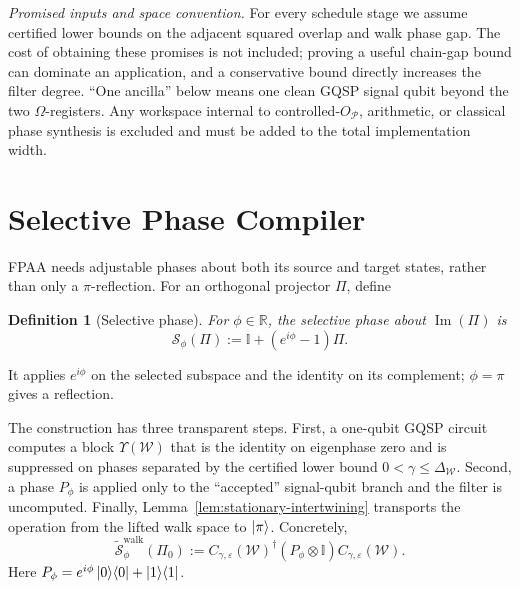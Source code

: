 \documentclass[10pt,conference]{IEEEtran}
\theoremstyle{plain}
\newtheorem{definition}[theorem]{Definition}
\theoremstyle{remark}
\begin{document}
\emph{Promised inputs and space convention.}
For every schedule stage we assume certified lower bounds on the
adjacent squared overlap and walk phase gap.  The cost of obtaining
these promises is not included; proving a useful chain-gap bound can
dominate an application, and a conservative bound directly increases
the filter degree.  ``One ancilla'' below means one clean GQSP signal
qubit beyond the two \(\Omega\)-registers.  Any workspace internal to
controlled-\(O_{\mathcal P}\), arithmetic, or classical phase
synthesis is excluded and must be added to the total implementation
width.











\section{Selective Phase Compiler}
\label{sec:selective-phase}

FPAA needs adjustable phases about both its source and target
states, rather than only a \(\pi\)-reflection.  For an orthogonal
projector \(\Pi\), define

\begin{definition}[Selective phase]
\label{def:selective_phase_operator}
For \(\phi\in\mathbb R\), the selective phase about
\(\operatorname{Im}(\Pi)\) is
\begin{equation}
\mathcal{S}_\phi(\Pi) := \mathbb{I} + (e^{i\phi}-1)\Pi.
\end{equation}
\end{definition}
It applies \(e^{i\phi}\) on the selected subspace and the identity on
its complement; \(\phi=\pi\) gives a reflection.

The construction has three transparent steps.  First, a one-qubit
GQSP circuit computes a block \(\Upsilon(\mathcal W)\) that is the
identity on eigenphase zero and is suppressed on phases separated by
the certified lower bound \(0<\gamma\leq\Delta_{\mathcal W}\).
Second, a phase \(P_\phi\) is applied only to the
``accepted'' signal-qubit branch and the filter is uncomputed.
Finally, Lemma~\ref{lem:stationary-intertwining} transports the
operation from the lifted walk space to \(\ket{\pi}\).  Concretely,
\begin{equation}
\label{eq:selective-phase-construction}
\widetilde{\mathcal{S}}^{\mathrm{walk}}_\phi(\Pi_0):=
C_{\gamma,\varepsilon}(\mathcal{W})^\dagger(P_\phi\otimes \mathbb{I})C_{\gamma,\varepsilon}(\mathcal{W}).
\end{equation}
Here \(P_\phi=e^{i\phi}\ket0\!\bra0+\ket1\!\bra1\).
\end{document}
